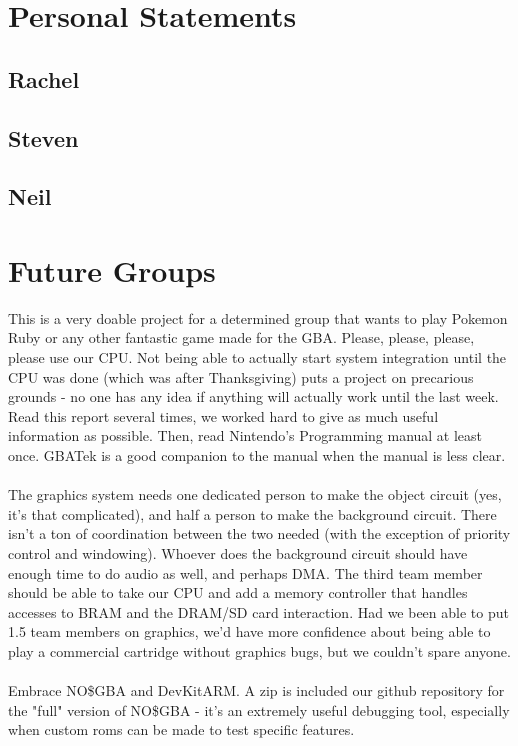 \documentclass[11pt,a4paper]{article}
\begin{document}
	\section{Personal Statements}
	\subsection{Rachel}
	
	\subsection{Steven}
	
	\subsection{Neil}
	
	
	\section{Future Groups}
	This is a very doable project for a determined group that wants to play Pokemon Ruby or any other fantastic game made for the GBA. Please, please, please, please use our CPU. Not being able to actually start system integration until the CPU was done (which was after Thanksgiving) puts a project on precarious grounds - no one has any idea if anything will actually work until the last week. Read this report several times, we worked hard to give as much useful information as possible. Then, read Nintendo's Programming manual at least once. GBATek is a good companion to the manual when the manual is less clear.\\\\
	The graphics system needs one dedicated person to make the object circuit (yes, it's that complicated), and half a person to make the background circuit. There isn't a ton of coordination between the two needed (with the exception of priority control and windowing). Whoever does the background circuit should have enough time to do audio as well, and perhaps DMA. The third team member should be able to take our CPU and add a memory controller that handles accesses to BRAM and the DRAM/SD card interaction. Had we been able to put 1.5 team members on graphics, we'd have more confidence about being able to play a commercial cartridge without graphics bugs, but we couldn't spare anyone.\\\\
	Embrace NO\$GBA and DevKitARM. A zip is included our github repository for the "full" version of NO\$GBA - it's an extremely useful debugging tool, especially when custom roms can be made to test specific features.\\\\
	
\end{document}
